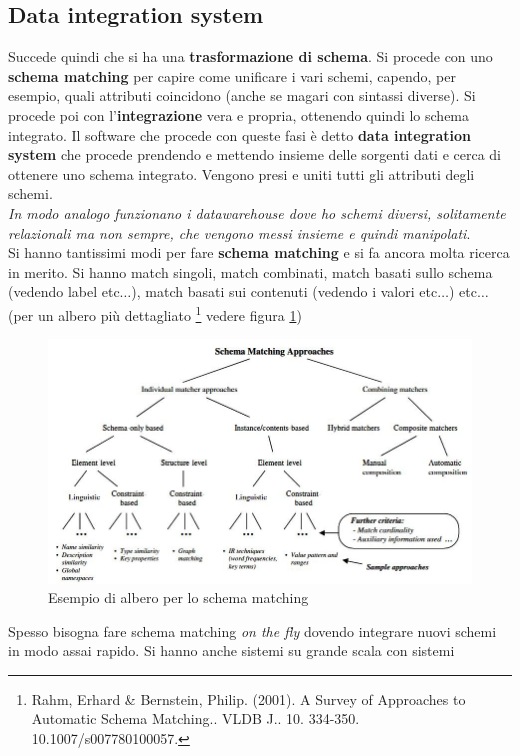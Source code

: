 \documentclass[a4paper,12pt, oneside]{book}
\begin{document}
\subsection{Data integration system}
Succede quindi che si ha una \textbf{trasformazione di schema}. Si procede con
uno \textbf{schema matching} per capire come unificare i vari schemi, capendo,
per esempio, quali attributi coincidono (anche se magari con sintassi
diverse). Si procede poi con l'\textbf{integrazione} vera e propria, ottenendo
quindi lo schema integrato. Il software che procede con queste fasi è detto
\textbf{data integration system} che procede prendendo e mettendo insieme delle
sorgenti dati e cerca di ottenere uno schema integrato. Vengono presi e uniti
tutti gli attributi degli schemi.\\
\textit{In modo analogo funzionano i datawarehouse dove ho schemi diversi,
  solitamente relazionali ma non sempre, che vengono messi insieme e quindi
  manipolati}.\\
Si hanno tantissimi modi per fare \textbf{schema matching} e si fa ancora molta
ricerca in merito. Si hanno match singoli, match combinati, match basati sullo
schema (vedendo label etc$\ldots$), match basati sui contenuti (vedendo i valori
etc$\ldots$) etc$\ldots$ (per un albero più dettagliato \footnote{Rahm, Erhard
  \& Bernstein, Philip. (2001). A Survey of Approaches to  Automatic Schema
  Matching.. VLDB J.. 10. 334-350. 10.1007/s007780100057.} vedere figura
\ref{fig:tree})
\begin{figure}
  \centering
  \includegraphics[scale = 0.4]{img/tree.jpg}
  \caption{Esempio di albero per lo schema matching } 
  \label{fig:tree}
\end{figure}
Spesso bisogna fare schema matching \textit{on the fly} dovendo integrare nuovi
schemi in modo assai rapido. Si hanno anche sistemi su grande scala con sistemi
\end{document}

